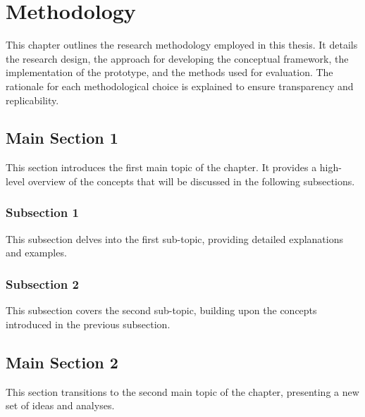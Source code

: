 
\chapter{Methodology} %

This chapter outlines the research methodology employed in this thesis. It details the research design, the approach for developing the conceptual framework, the implementation of the prototype, and the methods used for evaluation. The rationale for each methodological choice is explained to ensure transparency and replicability.


\section{Main Section 1}

This section introduces the first main topic of the chapter. It provides a high-level overview of the concepts that will be discussed in the following subsections.

\subsection{Subsection 1}

This subsection delves into the first sub-topic, providing detailed explanations and examples.


\subsection{Subsection 2}

This subsection covers the second sub-topic, building upon the concepts introduced in the previous subsection.


\section{Main Section 2}

This section transitions to the second main topic of the chapter, presenting a new set of ideas and analyses.